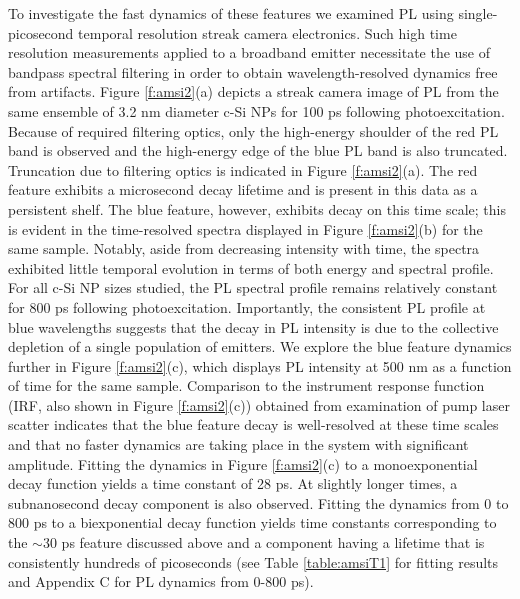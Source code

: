To investigate the fast dynamics of these features we examined PL using single-picosecond temporal resolution streak camera electronics. Such high time resolution measurements applied to a broadband emitter necessitate the use of bandpass spectral filtering in order to obtain wavelength-resolved dynamics free from artifacts. Figure \ref{f:amsi2}(a) depicts a streak camera image of PL from the same ensemble of 3.2 nm diameter c-Si NPs for 100 ps following photoexcitation. Because of required filtering optics, only the high-energy shoulder of the red PL band is observed and the high-energy edge of the blue PL band is also truncated. Truncation due to filtering optics is indicated in Figure \ref{f:amsi2}(a). The red feature exhibits a microsecond decay lifetime and is present in this data as a persistent shelf. The blue feature, however, exhibits decay on this time scale; this is evident in the time-resolved spectra displayed in Figure \ref{f:amsi2}(b) for the same sample. Notably, aside from decreasing intensity with time, the spectra exhibited little temporal evolution in terms of both energy and spectral profile. For all c-Si NP sizes studied, the PL spectral profile remains relatively constant for 800 ps following photoexcitation. Importantly, the consistent PL profile at blue wavelengths suggests that the decay in PL intensity is due to the collective depletion of a single population of emitters. We explore the blue feature dynamics further in Figure \ref{f:amsi2}(c), which displays PL intensity at 500 nm as a function of time for the same sample. Comparison to the instrument response function (IRF, also shown in Figure \ref{f:amsi2}(c)) obtained from examination of pump laser scatter indicates that the blue feature decay is well-resolved at these time scales and that no faster dynamics are taking place in the system with significant amplitude. Fitting the dynamics in Figure \ref{f:amsi2}(c) to a monoexponential decay function yields a time constant of 28 ps. At slightly longer times, a subnanosecond decay component is also observed. Fitting the dynamics from 0 to 800 ps to a biexponential decay function yields time constants corresponding to the $\sim$30 ps feature discussed above and a component having a lifetime that is consistently hundreds of picoseconds (see Table \ref{table:amsiT1} for fitting results and Appendix C for PL dynamics from 0-800 ps). \par

